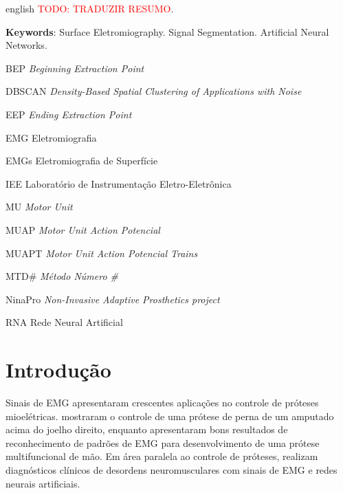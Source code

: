 \begin{resumo}[Abstract]
 \begin{otherlanguage*}{english}
	\textcolor{red}{TODO: TRADUZIR RESUMO}.
	
   \vspace{\onelineskip}
   \noindent 
   \textbf{Keywords}: Surface Eletromiography. Signal Segmentation. Artificial Neural Networks.
 \end{otherlanguage*}
\end{resumo}


\listoffigures*
\cleardoublepage

\listoftables*
\cleardoublepage

\begin{siglas}
	\item[BEP]		\emph{Beginning Extraction Point}
	\item[DBSCAN]	\emph{Density-Based Spatial Clustering of Applications with Noise}
	\item[EEP]		\emph{Ending Extraction Point}
  	\item[EMG]		Eletromiografia
	\item[EMGs]		Eletromiografia de Superfície
	\item[IEE]		Laboratório de Instrumentação Eletro-Eletrônica
	\item[MU]		\emph{Motor Unit}
  	\item[MUAP]		\emph{Motor Unit Action Potencial}
	\item[MUAPT]	\emph{Motor Unit Action Potencial Trains}
	\item[MTD\#]	\emph{Método Número \#}
	\item[NinaPro]	\emph{Non-Invasive Adaptive Prosthetics project}
	\item[RNA]		Rede Neural Artificial
\end{siglas}

\tableofcontents*
\cleardoublepage

\textual
	\chapter{Introdução}
Sinais de EMG apresentaram crescentes aplicações no controle de próteses mioelétricas. \cite{Hargrove2013} mostraram o controle de uma prótese de perna de um amputado acima do joelho direito, enquanto \cite{Jun-UkChu2007} apresentaram bons resultados de reconhecimento de padrões de EMG para desenvolvimento de uma prótese multifuncional de mão. Em área paralela ao controle de próteses, \cite{Pattichis1995} realizam diagnósticos clínicos de desordens neuromusculares com sinais de EMG e redes neurais artificiais.

